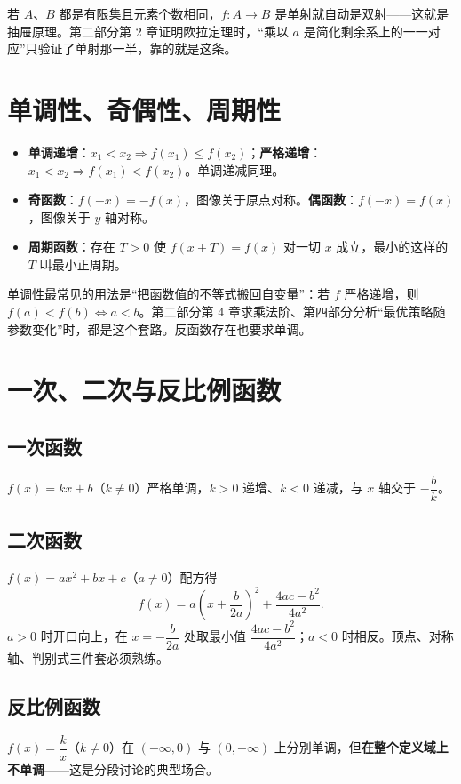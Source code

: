 \begin{tip}[有限集上单射自动是双射]
若 $A$、$B$ 都是有限集且元素个数相同，$f:A\to B$ 是单射就自动是双射——这就是抽屉原理。第二部分第 2 章证明欧拉定理时，“乘以 $a$ 是简化剩余系上的一一对应”只验证了单射那一半，靠的就是这条。
\end{tip}

\section{单调性、奇偶性、周期性}
\begin{itemize}
\item \textbf{单调递增}：$x_1<x_2\Rightarrow f(x_1)\le f(x_2)$；\textbf{严格递增}：$x_1<x_2\Rightarrow f(x_1)<f(x_2)$。单调递减同理。
\item \textbf{奇函数}：$f(-x)=-f(x)$，图像关于原点对称。\textbf{偶函数}：$f(-x)=f(x)$，图像关于 $y$ 轴对称。
\item \textbf{周期函数}：存在 $T>0$ 使 $f(x+T)=f(x)$ 对一切 $x$ 成立，最小的这样的 $T$ 叫最小正周期。
\end{itemize}
\begin{teach}[单调性怎么用]
单调性最常见的用法是“把函数值的不等式搬回自变量”：若 $f$ 严格递增，则 $f(a)<f(b)\iff a<b$。第二部分第 4 章求乘法阶、第四部分分析“最优策略随参数变化”时，都是这个套路。反函数存在也要求单调。
\end{teach}

\section{一次、二次与反比例函数}
\subsection{一次函数}
$f(x)=kx+b$（$k\ne0$）严格单调，$k>0$ 递增、$k<0$ 递减，与 $x$ 轴交于 $-\dfrac bk$。

\subsection{二次函数}
$f(x)=ax^2+bx+c$（$a\ne0$）配方得
\[
f(x)=a\left(x+\frac b{2a}\right)^2+\frac{4ac-b^2}{4a^2}.
\]
$a>0$ 时开口向上，在 $x=-\dfrac b{2a}$ 处取最小值 $\dfrac{4ac-b^2}{4a^2}$；$a<0$ 时相反。顶点、对称轴、判别式三件套必须熟练。

\subsection{反比例函数}
$f(x)=\dfrac kx$（$k\ne0$）在 $(-\infty,0)$ 与 $(0,+\infty)$ 上分别单调，但\textbf{在整个定义域上不单调}——这是分段讨论的典型场合。

